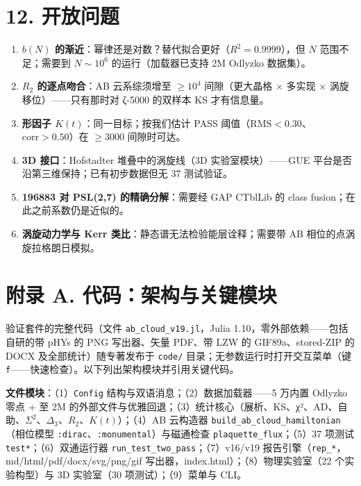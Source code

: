 \documentclass[
]{article}
\providecommand{\tightlist}{%
  \setlength{\itemsep}{0pt}\setlength{\parskip}{0pt}}
\begin{document}
\section{12. 开放问题}\label{ux5f00ux653eux95eeux9898}

\begin{enumerate}
\def\labelenumi{\arabic{enumi}.}
\tightlist
\item
  \textbf{\(b(N)\)
  的渐近}：幂律还是对数？替代拟合更好（\(R^2=0.9999\)），但 \(N\)
  范围不足；需要到 \(N\sim10^6\) 的运行（加载器已支持 2M Odlyzko
  数据集）。
\item
  \textbf{\(R_2\) 的逐点吻合}：AB 云系综须增至 \(\ge10^4\)
  间隙（更大晶格 × 多实现 × 涡旋移位）------只有那时对 ζ-5000 的双样本
  KS 才有信息量。
\item
  \textbf{形因子 \(K(t)\)}：同一目标；按我们估计 PASS
  阈值（\(\mathrm{RMS}<0.30\)、\(\mathrm{corr}>0.50\)）在 \(\ge3000\)
  间隙时可达。
\item
  \textbf{3D 接口}：Hofstadter 堆叠中的涡旋线（3D 实验室模块）------GUE
  平台是否沿第三维保持；已有初步数据但无 37 测试验证。
\item
  \textbf{196883 对 PSL(2,7) 的精确分解}：需要经 GAP CTblLib 的 class
  fusion；在此之前系数仍是近似的。
\item
  \textbf{涡旋动力学与 Kerr 类比}：静态谱无法检验能层诠释；需要带 AB
  相位的点涡旋拉格朗日模拟。
\end{enumerate}

\section{附录 A.
代码：架构与关键模块}\label{ux9644ux5f55-a.-ux4ee3ux7801ux67b6ux6784ux4e0eux5173ux952eux6a21ux5757}

验证套件的完整代码（文件 \texttt{ab\_cloud\_v19.jl}，Julia
1.10，零外部依赖------包括自研的带 pHYs 的 PNG 写出器、矢量 PDF、带 LZW
的 GIF89a、stored-ZIP 的 DOCX 及全部统计）随专著发布于 \texttt{code/}
目录；无参数运行时打开交互菜单（键
\texttt{f}------快速检查）。以下列出架构模块并引用关键代码。

\textbf{文件模块}：（1）\texttt{Config}
结构与双语消息；（2）数据加载器------5 万内置 Odlyzko 零点 + 至 2M
的外部文件与优雅回退；（3）统计核心（展析、KS、χ²、AD、自助、\(\Sigma^2\)、\(\Delta_3\)、\(R_2\)、\(K(t)\)）；（4）AB
云构造器 \texttt{build\_ab\_cloud\_hamiltonian}（相位模型
\texttt{:dirac}、\texttt{:monumental}）与磁通检查
\texttt{plaquette\_flux}；（5）37 项测试 \texttt{test*}；（6）双通运行器
\texttt{run\_test\_two\_pass}；（7）v16/v19
报告引擎（\texttt{rep\_*}，md/html/pdf/docx/svg/png/gif
写出器，index.html）；（8）物理实验室（22 个实验构型）与 3D 实验室（30
项测试）；（9）菜单与 CLI。
\end{document}
